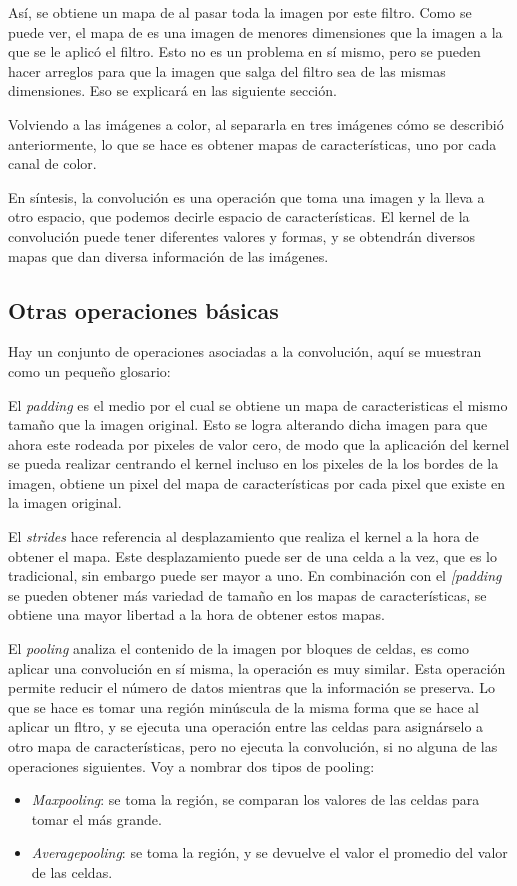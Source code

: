 \documentclass[14pt,a4paper]{report}
\begin{document}
Así, se obtiene un mapa de  al pasar toda la imagen por este filtro. Como se puede ver, el mapa de  es una imagen de menores dimensiones que la imagen a la que se le aplicó el filtro. Esto no es un problema en sí mismo, pero se pueden hacer arreglos para que la imagen que salga del filtro sea de las mismas dimensiones. Eso se explicará en las siguiente sección.

Volviendo a las imágenes a color, al separarla en tres imágenes cómo se describió anteriormente, lo que se hace es obtener mapas de características, uno por cada canal de color.

En síntesis, la convolución es una operación que toma una imagen y la lleva a otro espacio, que podemos decirle espacio de características. El kernel de la convolución puede tener diferentes valores y formas, y se obtendrán diversos mapas que dan diversa información de las imágenes.

\subsection*{Otras operaciones básicas}
Hay un conjunto de operaciones asociadas a la convolución, aquí se muestran como un pequeño glosario:

El \textit{padding} es el medio por el cual se obtiene un mapa de caracteristicas el mismo tamaño que la imagen original. Esto se logra alterando dicha imagen para que ahora este rodeada por pixeles de valor cero, de modo que la aplicación del kernel se pueda realizar centrando el kernel incluso en los pixeles de la los bordes de la imagen, obtiene un pixel del mapa de características por cada pixel que existe en la imagen original.

El \textit{strides} hace referencia al desplazamiento que realiza el kernel a la hora de obtener el mapa. Este desplazamiento puede ser de una celda a la vez, que es lo tradicional, sin embargo puede ser mayor a uno. En combinación con el \textit{[padding} se pueden obtener más variedad de tamaño en los mapas de características, se obtiene una mayor libertad a la hora de obtener estos mapas.

El \textit{pooling} analiza el contenido de la imagen por bloques de celdas, es como aplicar una convolución en sí misma, la operación es muy similar. Esta operación permite reducir el número de datos mientras que la información se preserva. Lo que se hace es tomar una región minúscula de la misma forma que se hace al aplicar un fltro, y se ejecuta una operación entre las celdas para asignárselo a otro mapa de características, pero no ejecuta la convolución, si no alguna de las operaciones siguientes. Voy a nombrar dos tipos de pooling:\\
\begin{itemize}
\item \textit{Maxpooling}: se toma la región, se comparan los valores de las celdas para tomar el más grande.
\item \textit{Averagepooling}: se toma la región, y se devuelve el valor el promedio del valor de las celdas.
\end{itemize}
\end{document}
